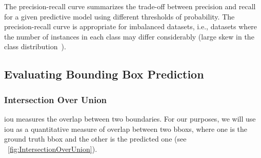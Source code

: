 The precision-recall curve summarizes the trade-off between precision and recall for a given predictive model using different thresholds of probability. The precision-recall curve is appropriate for imbalanced datasets, i.e., datasets where the number of instances in each class may differ considerably (large skew in the class distribution~\cite{davis2016prcurves}).

\subsection{Evaluating Bounding Box Prediction}
\label{ssec:EvaluatingBoundingBoxPrediction}

\subsubsection{Intersection Over Union}
\label{sssec:IntersectionOverUnion}


\Gls{iou} measures the overlap between two boundaries. For our purposes, we will use \gls{iou} as a quantitative measure of overlap between two \glspl{bbox}, where one is the ground truth \gls{bbox} and the other is the predicted one (see \figstr{}~\ref{fig:IntersectionOverUnion}).

